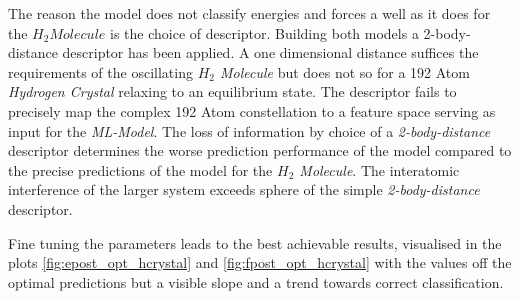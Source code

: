 The reason the model does not classify energies and forces a well as it does for the \textit{$H_2 Molecule$}  is the choice of descriptor. Building both models a {2-body-distance} descriptor has been applied. A one dimensional distance suffices the requirements of the oscillating \textit{$H_2$ Molecule} but does not so for a 192 Atom \textit{Hydrogen Crystal} relaxing to an equilibrium state. The descriptor fails to precisely map the complex 192 Atom constellation to a feature space serving as input for the \textit{ML-Model}. The loss of information by choice of a \textit{2-body-distance} descriptor determines the worse prediction performance of the model compared to the precise predictions of the model for the \textit{$H_2$ Molecule}. The interatomic interference of the larger system exceeds sphere of the simple \textit{2-body-distance} descriptor.

Fine tuning the parameters leads to the best achievable results, visualised in the plots \ref{fig:epost_opt_hcrystal} and \ref{fig:fpost_opt_hcrystal} with the values off the optimal predictions but a visible slope and a trend towards correct classification. 









